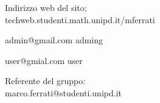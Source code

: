 \documentclass[1_relazione.tex]{subfiles}
\begin{document}
Indirizzo web del sito; \\
techweb.studenti.math.unipd.it/mferrati


admin@gmail.com
adming

user@gmial.com
user

Referente del gruppo: \\
marco.ferrati@studenti.unipd.it


%
 
\end{document}
